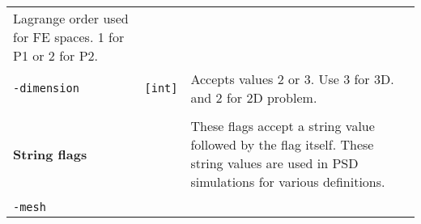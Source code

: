 \begin{longtable}[]{@{}lll@{}}
\begin{minipage}[t]{0.56\columnwidth}
Lagrange order used for FE spaces. 1 for P1 or 2 for P2.\strut
\end{minipage}\tabularnewline
\begin{minipage}[t]{0.26\columnwidth}\raggedright\strut
\lstinline!-dimension!\strut
\end{minipage} & \begin{minipage}[t]{0.09\columnwidth}\raggedright\strut
\lstinline![int]!\strut
\end{minipage} & \begin{minipage}[t]{0.56\columnwidth}\raggedright\strut
Accepts values 2 or 3. Use 3 for 3D. and 2 for 2D problem.\strut
\end{minipage}\tabularnewline
\begin{minipage}[t]{0.26\columnwidth}\raggedright\strut
\strut
\end{minipage} & \begin{minipage}[t]{0.09\columnwidth}\raggedright\strut
\strut
\end{minipage} & \begin{minipage}[t]{0.56\columnwidth}\raggedright\strut
\strut
\end{minipage}\tabularnewline
\begin{minipage}[t]{0.26\columnwidth}\raggedright\strut
\textbf{String flags}\strut
\end{minipage} & \begin{minipage}[t]{0.09\columnwidth}\raggedright\strut
\strut
\end{minipage} & \begin{minipage}[t]{0.56\columnwidth}\raggedright\strut
These flags accept a string value followed by the flag itself. These
string values are used in PSD simulations for various definitions.\strut
\end{minipage}\tabularnewline
\begin{minipage}[t]{0.26\columnwidth}\raggedright\strut
\strut
\end{minipage} & \begin{minipage}[t]{0.09\columnwidth}\raggedright\strut
\strut
\end{minipage} & \begin{minipage}[t]{0.56\columnwidth}\raggedright\strut
\strut
\end{minipage}\tabularnewline
\begin{minipage}[t]{0.26\columnwidth}\raggedright\strut
\lstinline!-mesh!\strut
\end{minipage} & \begin{minipage}[t]{0.09\columnwidth}\raggedright\strut

\end{minipage}
\end{longtable}
